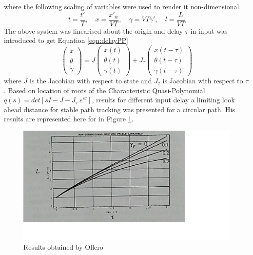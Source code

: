 where the following scaling of variables were used to render it non-dimensional. 
\begin{equation*}
t=\frac{t'}{T}, \quad x=\frac{x'_w}{VT}, \quad \gamma=VT\gamma',\quad l=\frac{L}{VT}
\end{equation*}
The above system was linearised about the origin and  delay $\tau$ in  input was introduced  to get Equation \ref{eqn:delayPP}
\begin{equation}
\label{eqn:delayPP}
\begin{pmatrix}
\dot{x}\\\dot{\theta}\\\dot{\gamma}
\end{pmatrix}
=J
\begin{pmatrix}
x(t)\\\theta(t)\\\gamma(t)
\end{pmatrix}+
J_\tau 
\begin{pmatrix}
x(t-\tau)\\\theta(t-\tau)\\\gamma(t-\tau)
\end{pmatrix}
\end{equation}
where $J$ is the Jacobian with respect to state and $J_\tau$ is Jacobian with respect to $\tau$. 
Based on location of roots of the Characteristic Quasi-Polynomial $q(s)=det[sI-J-J_\tau~ e^{s\tau} ] $, results for different input delay a limiting  look ahead distance for stable path tracking was presented for a  circular path. His results are represented here for  in Figure \ref{fig:resultsPP}.
  \begin{figure}
	\includegraphics[width=\linewidth]{Chapter7/fig/resultsPP}
	\caption{Results obtained by Ollero \cite{ollero1995stability} }
	\label{fig:resultsPP}
\end{figure}